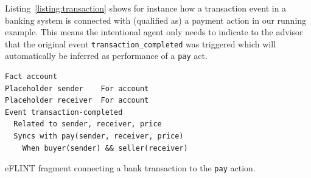 %
%
%
Listing~\ref{listing:transaction} shows for instance how a transaction event in a banking system is connected with (qualified as) a payment action in our running example. This means the intentional agent only needs to indicate to the advisor that the original event \texttt{transaction_completed} was triggered which will automatically be inferred as performance of a \texttt{pay} act.

\begin{listing}[t]
\centering
\begin{tcolorbox}[left=2pt,right=2pt,top=2pt,bottom=2pt,arc=0pt,
                  boxrule=0pt,toprule=1pt,
                  colback=white]
\begin{verbatim}
Fact account
Placeholder sender    For account
Placeholder receiver  For account
Event transaction-completed 
  Related to sender, receiver, price 
  Syncs with pay(sender, receiver, price) 
    When buyer(sender) && seller(receiver) 
\end{verbatim}
\end{tcolorbox}
\caption{eFLINT fragment connecting a bank transaction to the \texttt{pay} action.}
\label{listing:transaction}
\vspace{-5pt}\end{listing}

%
%
%

